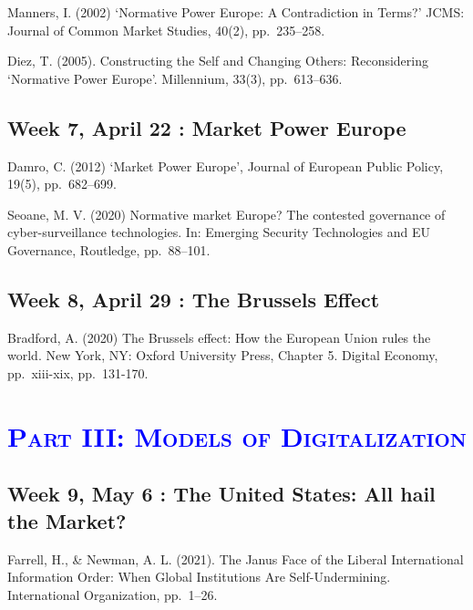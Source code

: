 \documentclass[12pt,]{article}
\begin{document}
Manners, I. (2002) `Normative Power Europe: A Contradiction in Terms?'
JCMS: Journal of Common Market Studies, 40(2), pp.~235--258.

Diez, T. (2005). Constructing the Self and Changing Others:
Reconsidering `Normative Power Europe'. Millennium, 33(3), pp.~613--636.

\hypertarget{week-7-april-22-market-power-europe}{%
\subsection{Week 7, April 22 : Market Power
Europe}\label{week-7-april-22-market-power-europe}}

Damro, C. (2012) `Market Power Europe', Journal of European Public
Policy, 19(5), pp.~682--699.

Seoane, M. V. (2020) Normative market Europe? The contested governance
of cyber-surveillance technologies. In: Emerging Security Technologies
and EU Governance, Routledge, pp.~88--101.

\hypertarget{week-8-april-29-the-brussels-effect}{%
\subsection{Week 8, April 29 : The Brussels
Effect}\label{week-8-april-29-the-brussels-effect}}

Bradford, A. (2020) The Brussels effect: How the European Union rules
the world. New York, NY: Oxford University Press, Chapter 5. Digital
Economy, pp.~xiii-xix, pp.~131-170.

\hypertarget{section-2}{%
\section{\texorpdfstring{\textcolor{Blue}{\textsc{Part III: Models of Digitalization}}}{}}\label{section-2}}

\vspace{0.5cm}

\hypertarget{week-9-may-6-the-united-states-all-hail-the-market}{%
\subsection{Week 9, May 6 : The United States: All hail the
Market?}\label{week-9-may-6-the-united-states-all-hail-the-market}}

Farrell, H., \& Newman, A. L. (2021). The Janus Face of the Liberal
International Information Order: When Global Institutions Are
Self-Undermining. International Organization, pp.~1--26.
\end{document}
